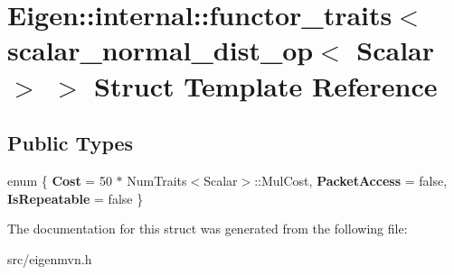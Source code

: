 \hypertarget{structEigen_1_1internal_1_1functor__traits_3_01scalar__normal__dist__op_3_01Scalar_01_4_01_4}{\section{Eigen\-:\-:internal\-:\-:functor\-\_\-traits$<$ scalar\-\_\-normal\-\_\-dist\-\_\-op$<$ Scalar $>$ $>$ Struct Template Reference}
\label{structEigen_1_1internal_1_1functor__traits_3_01scalar__normal__dist__op_3_01Scalar_01_4_01_4}
}
\subsection*{Public Types}
\begin{DoxyCompactItemize}
\item 
enum \{ {\bfseries Cost} = 50 $\ast$ Num\-Traits$<$Scalar$>$\-:\-:Mul\-Cost, 
{\bfseries Packet\-Access} = false, 
{\bfseries Is\-Repeatable} = false
 \}
\end{DoxyCompactItemize}


The documentation for this struct was generated from the following file\-:\begin{DoxyCompactItemize}
\item 
src/eigenmvn.\-h\end{DoxyCompactItemize}
